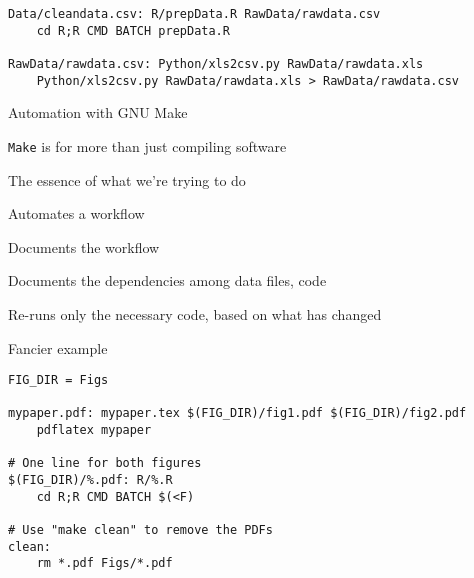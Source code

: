 \documentclass[12pt,t]{beamer}
\begin{document}
{\begin{frame}
\begin{center}
\begin{minipage}[c]{10.8cm}
\begin{semiverbatim}
\begin{lstlisting}[escapechar=!,linewidth=10.8cm]
Data/cleandata.csv: R/prepData.R RawData/rawdata.csv
    cd R;R CMD BATCH prepData.R

RawData/rawdata.csv: Python/xls2csv.py RawData/rawdata.xls
    Python/xls2csv.py RawData/rawdata.xls > RawData/rawdata.csv
\end{lstlisting}
\end{semiverbatim}
\end{minipage}
\end{center}
\end{frame}



\begin{frame}{Automation with GNU Make}

\vspace{24pt}

\bi
\itemsep12pt
\item {\tt Make} is for more than just compiling software
\item The {\color{hilit} essence} of what we're trying to do
\item Automates a workflow
\item Documents the workflow
\item Documents the dependencies among data files, code
\item Re-runs only the necessary code, based on what has changed
\ei


\end{frame}





\begin{frame}[fragile]{Fancier example}

\begin{semiverbatim}
\begin{lstlisting}
FIG_DIR = Figs

mypaper.pdf: mypaper.tex $(FIG_DIR)/fig1.pdf $(FIG_DIR)/fig2.pdf
    pdflatex mypaper

# One line for both figures
$(FIG_DIR)/%.pdf: R/%.R
    cd R;R CMD BATCH $(<F)

# Use "make clean" to remove the PDFs
clean:
    rm *.pdf Figs/*.pdf
\end{lstlisting}
\end{semiverbatim}


\end{frame}}
\end{document}
